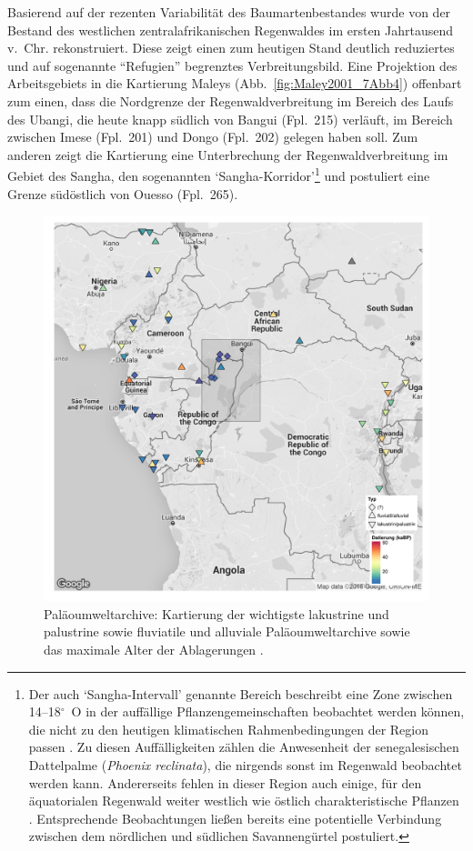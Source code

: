 Basierend auf der rezenten Variabilität des Baumartenbestandes wurde von \textcite{Maley.2001} der Bestand des westlichen zentralafrikanischen Regenwaldes im ersten Jahrtausend v.~Chr. rekonstruiert. Diese zeigt einen zum heutigen Stand deutlich reduziertes und auf sogenannte \enquote{Refugien} begrenztes Verbreitungsbild. Eine Projektion des Arbeitsgebiets in die Kartierung Maleys (Abb.~\ref{fig:Maley2001_7Abb4}) offenbart zum einen, dass die Nordgrenze der Regenwaldverbreitung im Bereich des Laufs des Ubangi, die heute knapp südlich von Bangui (Fpl.~215) verläuft, im Bereich zwischen Imese (Fpl.~201) und Dongo (Fpl.~202) gelegen haben soll. Zum anderen zeigt die Kartierung eine Unterbrechung der Regenwaldverbreitung im Gebiet des Sangha, den sogenannten \enquote*{Sangha-Korridor}\footnote{Der auch \enquote*{Sangha-Intervall} genannte Bereich beschreibt eine Zone zwischen 14--18$^\circ$~O in der auffällige Pflanzengemeinschaften beobachtet werden können, die nicht zu den heutigen klimatischen Rahmenbedingungen der Region passen \parencite{Gond.2013}. Zu diesen Auffälligkeiten zählen die Anwesenheit der senegalesischen Dattelpalme (\textit{Phoenix reclinata}), die nirgends sonst im Regenwald beobachtet werden kann. Andererseits fehlen in dieser Region auch einige, für den äquatorialen Regenwald weiter westlich wie östlich charakteristische Pflanzen \parencite[356f.]{Bostoen.2015}. Entsprechende Beobachtungen ließen bereits \textcite{Letouzey.1968} eine potentielle Verbindung zwischen dem nördlichen und südlichen Savannengürtel postuliert.} \parencites[siehe][]{Russell.2014}{Bostoen.2015} und postuliert eine Grenze südöstlich von Ouesso (Fpl.~265).

\begin{figure}[p]
\centering
\includegraphics[width=.8\textwidth]{fig/1-5_PalaeoUmwelt.pdf}
\caption{Paläoumweltarchive: Kartierung der wichtigste lakustrine und palustrine sowie fluviatile und alluviale Paläoumweltarchive sowie das maximale Alter der Ablagerungen \parencites[nach]{Brncic.2007}{Brncic.2009}{Sangen.2009}{Kiahtipes.2011}{Kiahtipes.2016}.}
\label{fig:PalaeoumweltArch_Karte}
\end{figure}

